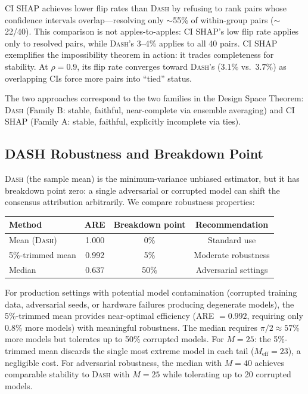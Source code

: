 \documentclass{article}
\newcommand{\DASH}{\textsc{Dash}}
\begin{document}
CI SHAP achieves lower flip rates than \DASH{} by refusing to rank pairs whose confidence intervals overlap---resolving only $\sim$55\% of within-group pairs ($\sim$22/40). This comparison is not apples-to-apples: CI SHAP's low flip rate applies only to resolved pairs, while \DASH{}'s 3--4\% applies to all 40 pairs. CI SHAP exemplifies the impossibility theorem in action: it trades completeness for stability. At $\rho = 0.9$, its flip rate converges toward \DASH{}'s ($3.1\%$ vs.\ $3.7\%$) as overlapping CIs force more pairs into ``tied'' status.

The two approaches correspond to the two families in the Design Space Theorem: \DASH{} (Family B: stable, faithful, near-complete via ensemble averaging) and CI SHAP (Family A: stable, faithful, explicitly incomplete via ties).

\subsection{DASH Robustness and Breakdown Point}
\label{sec:dash-robustness}

\DASH{} (the sample mean) is the minimum-variance unbiased estimator, but it has breakdown point zero: a single adversarial or corrupted model can shift the consensus attribution arbitrarily. We compare robustness properties:

\begin{center}
\small
\begin{tabular}{@{}lccc@{}}
\toprule
Method & ARE & Breakdown point & Recommendation \\
\midrule
Mean (\DASH{}) & 1.000 & 0\% & Standard use \\
5\%-trimmed mean & 0.992 & 5\% & Moderate robustness \\
Median & 0.637 & 50\% & Adversarial settings \\
\bottomrule
\end{tabular}
\end{center}

For production settings with potential model contamination (corrupted training data, adversarial seeds, or hardware failures producing degenerate models), the 5\%-trimmed mean provides near-optimal efficiency (ARE $= 0.992$, requiring only $0.8\%$ more models) with meaningful robustness. The median requires $\pi/2 \approx 57\%$ more models but tolerates up to 50\% corrupted models. For $M = 25$: the 5\%-trimmed mean discards the single most extreme model in each tail ($M_{\text{eff}} = 23$), a negligible cost. For adversarial robustness, the median with $M = 40$ achieves comparable stability to \DASH{} with $M = 25$ while tolerating up to 20 corrupted models.
\end{document}
